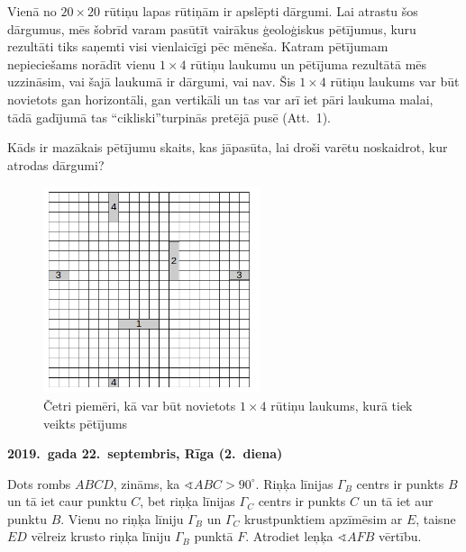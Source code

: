 \documentclass[11pt]{article}
\begin{document}
\begin{problem}[BW.TST.2019.8]
Vienā no $20 \times 20$ rūtiņu lapas rūtiņām ir apslēpti dārgumi. 
Lai atrastu šos dārgumus, mēs šobrīd varam pasūtīt vairākus ģeoloģiskus
pētījumus, kuru rezultāti tiks saņemti visi vienlaicīgi pēc mēneša. 
Katram pētījumam nepieciešams norādīt vienu $1 \times 4$ rūtiņu laukumu un 
pētījuma rezultātā mēs uzzināsim, vai šajā laukumā ir dārgumi, vai nav. 
Šis $1 \times 4$ rūtiņu laukums var būt novietots gan horizontāli, 
gan vertikāli un tas var arī iet pāri laukuma malai, tādā gadījumā tas
``cikliski''turpinās pretējā pusē (Att.\ 1). 

Kāds ir mazākais pētījumu skaits, kas jāpasūta, lai droši varētu noskaidrot, 
kur atrodas dārgumi?

\begin{figure}[H]
\centerline{\includegraphics[width=2.5in]{Pictures/bw-tst-2019-8.png}}
\caption{Četri piemēri, kā var būt novietots $1 \times 4$ rūtiņu laukums, kurā 
tiek veikts pētījums}
\label{fig:01}
\end{figure}
\end{problem}




\begin{center}
{\bf 2019.\ gada 22.\ septembris, Rīga (2.\ diena)}
\end{center}

\begin{problem}[BW.TST.2019.9]
Dots rombs $ABCD$, zināms, ka $\sphericalangle ABC > 90^{\circ}$. 
Riņķa līnijas $\Gamma_{B}$ centrs ir punkts $B$ un tā iet caur
punktu $C$, bet riņķa līnijas $\Gamma_C$ centrs ir punkts $C$ un tā
iet aur punktu $B$. Vienu no riņķa līniju 
$\Gamma_B$ un $\Gamma_C$ krustpunktiem apzīmēsim ar $E$, 
taisne $ED$ vēlreiz krusto riņķa līniju $\Gamma_B$ punktā $F$. 
Atrodiet leņķa $\sphericalangle AFB$ vērtību. 
\end{problem}
\end{document}
